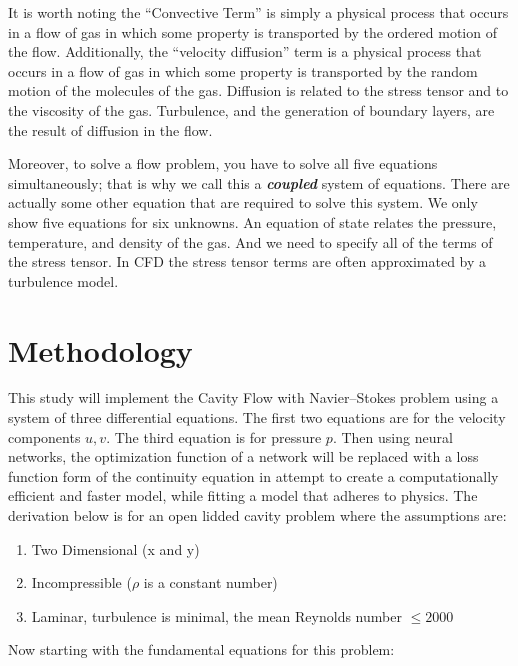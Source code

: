 \documentclass{article}
\begin{document}
It is worth noting the ``Convective Term'' is simply a physical process that
occurs in a flow of gas in which some property is transported by the ordered
motion of the flow.\cite{NASA}
Additionally, the ``velocity diffusion'' term is a physical process that
occurs in a flow of gas in which some property is transported by the random
motion of the molecules of the gas. Diffusion is related to the stress tensor
and to the viscosity of the gas. Turbulence, and the generation of boundary
layers, are the result of diffusion in the flow.

Moreover, to solve a flow problem, you have to solve all five equations
simultaneously; that is why we call this a \textit{\textbf{coupled}} system of
equations. There are actually some other equation that are required to solve
this system. We only show five equations for six unknowns. An equation of state
relates the pressure, temperature, and density of the gas. And we need to
specify all of the terms of the stress tensor. In CFD the stress tensor terms
are often approximated by a turbulence model.\cite{NASA}

\section{Methodology\cite{Barba2019}} \label{methodology}

This study will implement the Cavity Flow with Navier–Stokes problem
using a system of three differential equations. The first two equations are for
the velocity components $u,v$. The third equation is for pressure $p$. Then
using neural networks, the optimization function of a network will be replaced
with a loss function form of the continuity equation in attempt to create a
computationally efficient and faster model, while fitting a model that adheres
to physics. The derivation below is for an open lidded cavity problem where the
assumptions are:

\begin{enumerate}
	\item Two Dimensional (x and y)
	\item Incompressible ($\rho$ is a constant number)
	\item Laminar, turbulence is minimal, the mean Reynolds number $\le
		      2000$
\end{enumerate}

\noindent Now starting with the fundamental equations for this
problem:\\
\end{document}
